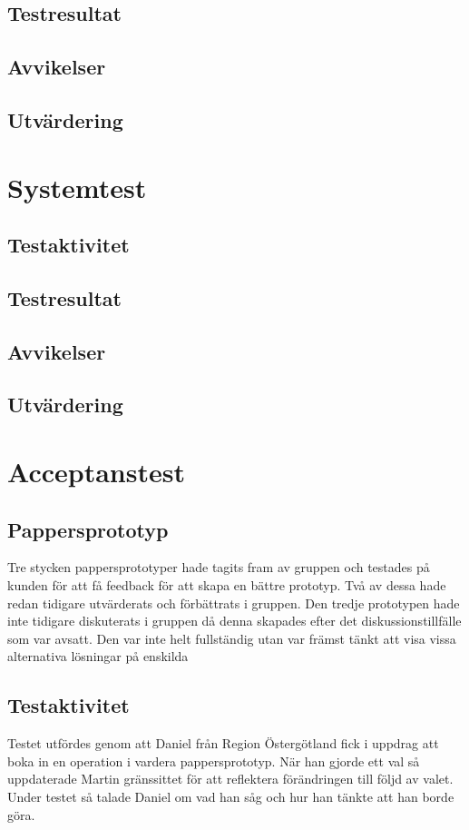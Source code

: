 \documentclass[a4paper,10pt]{article}
\begin{document}
\subsection{Testresultat}
\subsection{Avvikelser}
\subsection{Utvärdering}
\section{Systemtest}
\subsection{Testaktivitet}
\subsection{Testresultat}
\subsection{Avvikelser}
\subsection{Utvärdering}
\section{Acceptanstest}
\subsection{Pappersprototyp}
Tre stycken pappersprototyper hade tagits fram av gruppen och testades på kunden för att få feedback för att skapa en bättre prototyp. Två av dessa hade redan tidigare utvärderats och förbättrats i gruppen. Den tredje prototypen hade inte tidigare diskuterats i gruppen då denna skapades efter det diskussionstillfälle som var avsatt. Den var inte helt fullständig utan var främst tänkt att visa vissa alternativa lösningar på enskilda
\subsection{Testaktivitet}
Testet utfördes genom att Daniel från Region Östergötland fick i uppdrag att boka in en operation i vardera pappersprototyp. När han gjorde ett val så uppdaterade Martin gränssittet för att reflektera förändringen till följd av valet. Under testet så talade Daniel om vad han såg och hur han tänkte att han borde göra.
\end{document}
